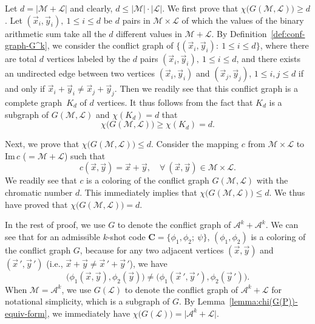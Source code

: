 \documentclass[11pt,draftclsnofoot,onecolumn]{IEEEtran}
\newcommand{\mbC}{\mathbf{C}}
\def\Im{\mathrm{Im}}
\begin{document}
\begin{IEEEproof}
Let $d=|\mathcal{M}+\mathcal{L}|$ and clearly, $d\leq |\mathcal{M}|\cdot|\mathcal{L}|$. We first prove that $\chi\big(G(\mathcal{M},\mathcal{L})\big)\geq d$.
Let $(\vec{x}_i,\vec{y}_i),~1\leq i \leq d$ be $d$ pairs in $\mathcal{M}\times\mathcal{L}$ of which the values of the binary arithmetic sum take all the $d$ different values in $\mathcal{M}+\mathcal{L}$. By Definition~\ref{def:conf-graph-G^k}, we consider the conflict graph of $\big\{(\vec{x}_i,\vec{y}_i):~1\leq i\leq d\big\}$, where there are total $d$ vertices labeled by the $d$ pairs $(\vec{x}_i,\vec{y}_i),~1\leq i\leq d$, and there exists an undirected edge between two vertices $(\vec{x}_i, \vec{y}_i)$ and $(\vec{x}_j,\vec{y}_j)$, $1\leq i,j\leq d$ if and only if $\vec{x}_i+\vec{y}_i\neq \vec{x}_j+\vec{y}_j$. Then we readily see that this conflict graph is a complete graph~$K_d$ of $d$ vertices. It thus follows from  the fact that $K_d$ is a subgraph of $G(\mathcal{M},\mathcal{L})$ and $\chi(K_d)=d$ that
\begin{equation*}
\chi\big(G(\mathcal{M},\mathcal{L})\big)\geq\chi(K_d)=d.
\end{equation*}

Next, we prove that $\chi\big(G(\mathcal{M},\mathcal{L})\big)\leq d$. Consider the mapping $c$ from $\mathcal{M}\times\mathcal{L}$ to $\Im\,c$ ($=\mathcal{M}+\mathcal{L}$)
 such that
\begin{equation*}
c(\vec{x}, \vec{y})=\vec{x}+\vec{y},\quad\forall~(\vec{x}, \vec{y})\in\mathcal{M}\times\mathcal{L}.
\end{equation*}
We readily see that $c$ is a coloring of the conflict graph $G(\mathcal{M},\mathcal{L})$ with
the chromatic number $d$. This immediately implies that
$\chi\big(G(\mathcal{M},\mathcal{L})\big)\leq d$. We thus have proved that $\chi\big(G(\mathcal{M},\mathcal{L}) \big)= d$.
\end{IEEEproof}

In the rest of proof, we use $G$ to denote the conflict graph of $\mathcal{A}^k+\mathcal{A}^k$.
We can see that for an admissible $k$-shot  code $\mbC=\big\{\phi_1,\phi_2;~\psi\big\}$, $(\phi_{1},\phi_{2})$  is a coloring of the conflict graph $G$, because for any two adjacent vertices $(\vec{x}, \vec{y})$ and $(\vec{x}\,',\vec{y}\,')$  (i.e., $\vec{x}+\vec{y}\neq \vec{x}\,'+\vec{y}\,'$), we have
\begin{equation*}
\big(\phi_{1}(\vec{x},\vec{y}), \phi_{2}(\vec{y})\big)\neq \big(\phi_{1}(\vec{x}\,',\vec{y}\,'),
\phi_{2}(\vec{y}\,')\big).\label{eq:adm-code-is-color-G^k}
\end{equation*}
When $\mathcal{M}=\mathcal{A}^k$, we use $G(\mathcal{L})$ to denote the conflict graph of $\mathcal{A}^k+\mathcal{L}$ for notational simplicity, which is a subgraph of $G$. By Lemma~\ref{lemma:chi(G(P))-equiv-form}, we immediately have $\chi\big(G(\mathcal{L})\big)=\big|\mathcal{A}^k+\mathcal{L}\big|$.
\end{document}
